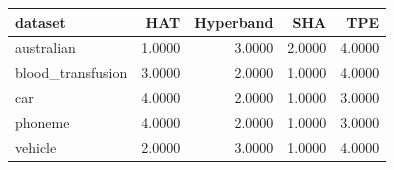 \begin{tabular}{lrrrr}
\toprule
dataset & HAT & Hyperband & SHA & TPE \\
\midrule
australian & 1.0000 & 3.0000 & 2.0000 & 4.0000 \\
blood_transfusion & 3.0000 & 2.0000 & 1.0000 & 4.0000 \\
car & 4.0000 & 2.0000 & 1.0000 & 3.0000 \\
phoneme & 4.0000 & 2.0000 & 1.0000 & 3.0000 \\
vehicle & 2.0000 & 3.0000 & 1.0000 & 4.0000 \\
\bottomrule
\end{tabular}
